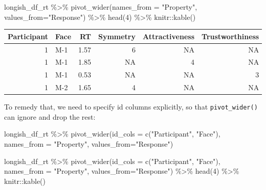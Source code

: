 \documentclass[
]{book}
\newenvironment{Shaded}{\begin{snugshade}}{\end{snugshade}}
\newcommand{\AttributeTok}[1]{\textcolor[rgb]{0.77,0.63,0.00}{#1}}
\newcommand{\DecValTok}[1]{\textcolor[rgb]{0.00,0.00,0.81}{#1}}
\newcommand{\FunctionTok}[1]{\textcolor[rgb]{0.00,0.00,0.00}{#1}}
\newcommand{\NormalTok}[1]{#1}
\newcommand{\SpecialCharTok}[1]{\textcolor[rgb]{0.00,0.00,0.00}{#1}}
\newcommand{\StringTok}[1]{\textcolor[rgb]{0.31,0.60,0.02}{#1}}
\begin{document}
\begin{Shaded}
\begin{Highlighting}[]
\NormalTok{longish\_df\_rt }\SpecialCharTok{\%\textgreater{}\%}
  \FunctionTok{pivot\_wider}\NormalTok{(}\AttributeTok{names\_from =} \StringTok{"Property"}\NormalTok{, }\AttributeTok{values\_from=}\StringTok{"Response"}\NormalTok{) }\SpecialCharTok{\%\textgreater{}\%}
  \FunctionTok{head}\NormalTok{(}\DecValTok{4}\NormalTok{) }\SpecialCharTok{\%\textgreater{}\%}
\NormalTok{  knitr}\SpecialCharTok{::}\FunctionTok{kable}\NormalTok{()}
\end{Highlighting}
\end{Shaded}

\begin{tabular}{r|l|r|r|r|r}
\hline
Participant & Face & RT & Symmetry & Attractiveness & Trustworthiness\\
\hline
1 & M-1 & 1.57 & 6 & NA & NA\\
\hline
1 & M-1 & 1.85 & NA & 4 & NA\\
\hline
1 & M-1 & 0.53 & NA & NA & 3\\
\hline
1 & M-2 & 1.65 & 4 & NA & NA\\
\hline
\end{tabular}

To remedy that, we need to specify id columns explicitly, so that \texttt{pivot\_wider()} can ignore and drop the rest:

\begin{Shaded}
\begin{Highlighting}[]
\NormalTok{longish\_df\_rt }\SpecialCharTok{\%\textgreater{}\%}
  \FunctionTok{pivot\_wider}\NormalTok{(}\AttributeTok{id\_cols =} \FunctionTok{c}\NormalTok{(}\StringTok{"Participant"}\NormalTok{, }\StringTok{"Face"}\NormalTok{), }\AttributeTok{names\_from =} \StringTok{"Property"}\NormalTok{, }\AttributeTok{values\_from=}\StringTok{"Response"}\NormalTok{)}
\end{Highlighting}
\end{Shaded}

\begin{Shaded}
\begin{Highlighting}[]
\NormalTok{longish\_df\_rt }\SpecialCharTok{\%\textgreater{}\%}
  \FunctionTok{pivot\_wider}\NormalTok{(}\AttributeTok{id\_cols =} \FunctionTok{c}\NormalTok{(}\StringTok{"Participant"}\NormalTok{, }\StringTok{"Face"}\NormalTok{), }\AttributeTok{names\_from =} \StringTok{"Property"}\NormalTok{, }\AttributeTok{values\_from=}\StringTok{"Response"}\NormalTok{) }\SpecialCharTok{\%\textgreater{}\%}
  \FunctionTok{head}\NormalTok{(}\DecValTok{4}\NormalTok{) }\SpecialCharTok{\%\textgreater{}\%}
\NormalTok{  knitr}\SpecialCharTok{::}\FunctionTok{kable}\NormalTok{()}
\end{Highlighting}
\end{Shaded}
\end{document}
